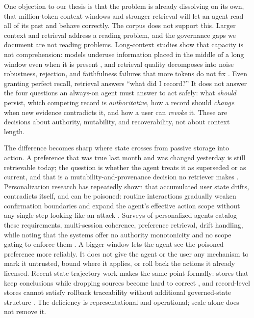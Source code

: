 One objection to our thesis is that the problem is already dissolving on its own, that million-token context windows and stronger retrieval will let an agent read all of its past and behave correctly. The corpus does not support this. Larger context and retrieval address a reading problem, and the governance gaps we document are not reading problems. Long-context studies show that capacity is not comprehension: models underuse information placed in the middle of a long window even when it is present \citep{liu2023lostmiddlelanguagemodels}, and retrieval quality decomposes into noise robustness, rejection, and faithfulness failures that more tokens do not fix \citep{chen2023benchmarkinglargelanguagemodels}. Even granting perfect recall, retrieval answers ``what did I record?'' It does not answer the four questions an always-on agent must answer to act safely: what \emph{should} persist, which competing record is \emph{authoritative}, how a record should \emph{change} when new evidence contradicts it, and how a user can \emph{revoke} it. These are decisions about authority, mutability, and recoverability, not about context length.

The difference becomes sharp where state crosses from passive storage into action. A preference that was true last month and was changed yesterday is still retrievable today; the question is whether the agent treats it as superseded or as current, and that is a mutability-and-provenance decision no retriever makes \citep{uddin2026recallforgettingbenchmarkinglongterm, ma2026memprobe}. Personalization research has repeatedly shown that accumulated user state drifts, contradicts itself, and can be poisoned: routine interactions gradually weaken confirmation boundaries and expand the agent's effective action scope without any single step looking like an attack \citep{xu2026toxicchats}. Surveys of personalized agents catalog these requirements, multi-session coherence, preference retrieval, drift handling, while noting that the systems offer no authority monotonicity and no scope gating to enforce them \citep{xu2026personalizedllmpoweredagentsfoundations}. A bigger window lets the agent see the poisoned preference more reliably. It does not give the agent or the user any mechanism to mark it untrusted, bound where it applies, or roll back the actions it already licensed. Recent state-trajectory work makes the same point formally: stores that keep conclusions while dropping sources become hard to correct \citep{kwon2026reclaim}, and record-level stores cannot satisfy rollback traceability without additional governed-state structure \citep{orogat2026gem}. The deficiency is representational and operational; scale alone does not remove it.

